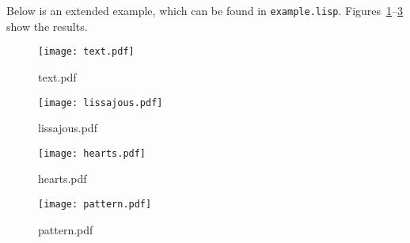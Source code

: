\documentclass[12pt,letterpaper]{article}
\begin{document}
Below is an extended example, which can be found in
\texttt{example.lisp}.  Figures~\ref{fig:text}--\ref{fig:hearts} show
the results.



\begin{figure}[htbp]
  \centering
  \texttt{[image: text.pdf]}
  \caption{text.pdf}
  \label{fig:text}
\end{figure}

\begin{figure}[htbp]
  \centering
  \texttt{[image: lissajous.pdf]}
  \caption{lissajous.pdf}
  \label{fig:lissajous}
\end{figure}

\begin{figure}[htbp]
  \centering
  \texttt{[image: hearts.pdf]}
  \caption{hearts.pdf}
  \label{fig:hearts}
\end{figure}

\begin{figure}[htbp]
  \centering
  \texttt{[image: pattern.pdf]}
  \caption{pattern.pdf}
  \label{fig:pattern}
\end{figure}
\end{document}
